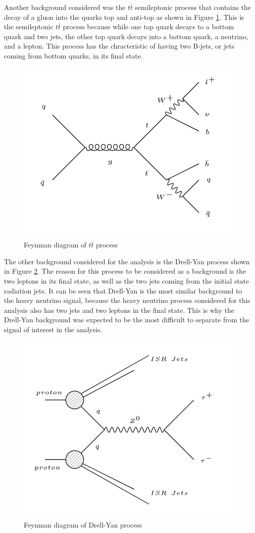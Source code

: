Another background considered was the $t\bar{t}$ semileptonic process that contains the decay of a gluon into the quarks top and anti-top as shown in Figure \ref{fig: ttbar_background}. This is the semileptonic $t\bar{t}$ process because while one top quark decays to a bottom quark and two jets, the other top quark decays into a bottom quark, a neutrino, and a lepton. This process has the chracteristic of having two B-jets, or jets coming from bottom quarks, in its final state.


\begin{figure}[H]
\centering
\includegraphics[width = \linewidth]{ttbar}
\caption{Feynman diagram of $t\bar{t}$ process}
\label{fig: ttbar_background}
\end{figure}

The other background considered for the analysis is the Drell-Yan process shown in Figure \ref{fig: DY_background}. The reason for this process to be considered as a background is the two leptons in its final state, as well as the two jets coming from the initial state radiation jets. It can be seen that Drell-Yan is the most similar background to the heavy neutrino signal, because the heavy neutrino process considered for this analysis also has two jets and two leptons in the final state. This is why the Drell-Yan background was expected to be the most difficult to separate from the signal of interest in the analysis.

\begin{figure}[H]
\centering
\includegraphics[width = 0.7\linewidth]{Drell-Yan}
\caption{Feynman diagram of Drell-Yan process}
\label{fig: DY_background}
\end{figure}